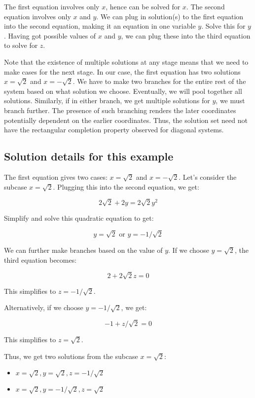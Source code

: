 \documentclass[10pt]{amsart}
\begin{document}
The first equation involves only $x$, hence can be solved for $x$. The
second equation involves only $x$ and $y$. We can plug in solution(s)
to the first equation into the second equation, making it an equation
in one variable $y$. Solve this for $y$. Having got possible values of
$x$ and $y$, we can plug these into the third equation to solve for $z$.

Note that the existence of multiple solutions at any stage means that
we need to make cases for the next stage. In our case, the first
equation has two solutions $x = \sqrt{2}$ and $x = -\sqrt{2}$. We have
to make two branches for the entire rest of the system based on what
solution we choose. Eventually, we will pool together all
solutions. Similarly, if in either branch, we get multiple solutions
for $y$, we must branch further. The presence of such branching
renders the later coordinates potentially dependent on the earlier
coordinates. Thus, the solution set need not have the rectangular
completion property observed for diagonal systems.

\subsection*{Solution details for this example}

The first equation gives two cases: $x = \sqrt{2}$ and $x =
-\sqrt{2}$. Let's consider the subcase $x = \sqrt{2}$. Plugging this
into the second equation, we get:

$$2\sqrt{2} + 2y = 2\sqrt{2}y^2$$

Simplify and solve this quadratic equation to get:

$$y = \sqrt{2} \text{ or } y = -1/\sqrt{2}$$

We can further make branches based on the value of $y$. If we choose
$y = \sqrt{2}$, the third equation becomes:

$$2 + 2\sqrt{2}z = 0$$

This simplifies to $z = -1/\sqrt{2}$.

Alternatively, if we choose $y = -1/\sqrt{2}$, we get:

$$-1 + z/\sqrt{2} = 0$$

This simplifies to $z = \sqrt{2}$.

Thus, we get two solutions from the subcase $x = \sqrt{2}$:

\begin{itemize}
\item $x = \sqrt{2}, y = \sqrt{2}, z = -1/\sqrt{2}$
\item $x = \sqrt{2}, y = -1/\sqrt{2}, z = \sqrt{2}$
\end{itemize}
\end{document}
